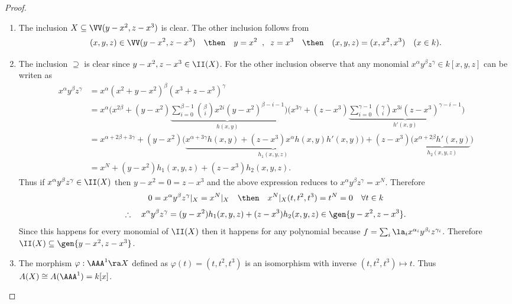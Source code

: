 \begin{proof}$\;$\\
  \begin{enumerate}
  \item The inclusion $X\subseteq\VV(y-x^2,z-x^3)$ is clear. The other inclusion
    follows from
    \[
      (x,y,z)\in\VV(y-x^2,z-x^3)\quad\then\quad
      y=x^2\;\; , \;\; z=x^3 \quad\then\quad
      (x,y,z)=(x,x^2,x^3)\quad (x\in k).
    \]
  \item The inclusion $\supseteq$ is clear since $y-x^2,z-x^3\in\II(X)$. For the other
    inclusion observe that any monomial $x^{\alpha}y^{\beta}z^{\gamma}\in k[x,y,z]$ can be
    writen as
    \begin{align*}
      x^{\alpha}y^{\beta}z^{\gamma} & = x^{\alpha}(x^2+y-x^2)^{\beta}(x^3+z-x^3)^{\gamma} \\
      & = x^{\alpha}\Big( x^{2\beta}+(y-x^2)\underset{h(x,y)}%
      {\underbrace{\sum_{i=0}^{\beta-1}\binom{\beta}{i}x^{2i}(y-x^2)^{\beta-i-1}}}
    \Big) \Big(x^{3\gamma}+(z-x^3)\underset{h'(x,y)}%
    {\underbrace{\sum_{i=0}^{\gamma-1}\binom{\gamma}{i}x^{3i}(z-x^3)^{\gamma-i-1}}}\Big)\\
    & = x^{\alpha+2\beta+3\gamma}+(y-x^2)\big(\underset{h_1(x,y,z)}%
    {\underbrace{x^{\alpha+3\gamma}h(x,y)+(z-x^3)x^{\alpha}h(x,y)h'(x,y)}} \big)+
    (z-x^3)\big(\underset{h_2(x,y,z)}{\underbrace{x^{\alpha+2\beta}h'(x,y)}}\big) \\
    & = x^N+(y-x^2)h_1(x,y,z)+(z-x^3)h_2(x,y,z).
    \end{align*}
    Thus if $x^{\alpha}y^{\beta}z^{\gamma}\in\II(X)$ then $y-x^2=0=z-x^3$ and the above
    expression reduces to $x^{\alpha}y^{\beta}z^{\gamma}=x^N$. Therefore
    \[
      0=x^{\alpha}y^{\beta}z^{\gamma}|_X=x^N|_X \quad\then\quad
      x^N|_X(t,t^2,t^3)=t^N=0\quad\forall t\in k
    \]
    \[
      \therefore\quad x^{\alpha}y^{\beta}z^{\gamma}=(y-x^2)h_1(x,y,z)+(z-x^3)h_2(x,y,z)\in\gen{y-x^2,z-x^3}.
    \]
    Since this happens for every monomial of $\II(X)$ then it happens for any polynomial
    because $f=\sum_i \la_i x^{\alpha_i}y^{\beta_i}z^{\gamma_i}$. Therefore
    $\II(X)\subseteq\gen{y-x^2,z-x^3}$.
  \item The morphism $\varphi:\AAA^1\ra X$ defined as $\varphi(t)=(t,t^2,t^3)$ is an
    isomorphism with inverse $(t,t^2,t^3)\mapsto t$. Thus $A(X)\cong A(\AAA^1)=k[x]$.
  \end{enumerate}

\begin{figure}[ht] %
  \centering
  \caption{Twisted Cubic Curve over $k=\RR$}
  \begin{subfigure}{0.48\textwidth}
  \end{subfigure}
  \begin{subfigure}{0.48\textwidth}
  \end{subfigure}
\end{figure}%
%
\end{proof}%

